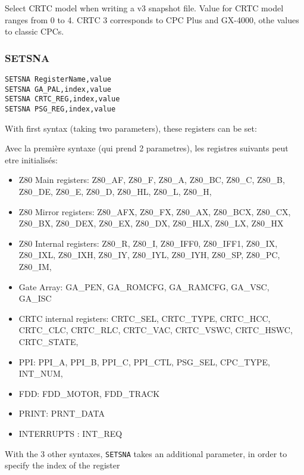 \begin{xen}
Select CRTC model when writing a v3 snapshot file. Value for CRTC model ranges from 0 to 4. CRTC 3 corresponds to CPC Plus and GX-4000, othe values to classic CPCs.
\end{xen}

\subsubsection{SETSNA}

\begin{verbatim}
SETSNA RegisterName,value
SETSNA GA_PAL,index,value
SETSNA CRTC_REG,index,value
SETSNA PSG_REG,index,value
\end{verbatim}

\begin{xen}
With first syntax (taking two parameters), these registers can be set:
\end{xen}

\begin{xfr}
Avec la première syntaxe (qui prend 2 parametres), les registres suivants peut etre initialisés:
\end{xfr}

\begin{itemize}
\item Z80 Main registers:
  Z80\_AF, Z80\_F, Z80\_A, Z80\_BC, Z80\_C, Z80\_B, Z80\_DE, Z80\_E, Z80\_D, Z80\_HL, Z80\_L, Z80\_H,
\item Z80 Mirror registers:
  Z80\_AFX, Z80\_FX, Z80\_AX, Z80\_BCX, Z80\_CX, Z80\_BX, Z80\_DEX, Z80\_EX, Z80\_DX, Z80\_HLX, Z80\_LX, Z80\_HX
\item Z80 Internal registers:
  Z80\_R, Z80\_I, Z80\_IFF0, Z80\_IFF1, Z80\_IX, Z80\_IXL, Z80\_IXH, Z80\_IY, Z80\_IYL, Z80\_IYH, Z80\_SP, Z80\_PC, Z80\_IM,
\item Gate Array:
  GA\_PEN, GA\_ROMCFG, GA\_RAMCFG, GA\_VSC, GA\_ISC
\item CRTC internal registers:
  CRTC\_SEL, CRTC\_TYPE, CRTC\_HCC, CRTC\_CLC, CRTC\_RLC, CRTC\_VAC, CRTC\_VSWC, CRTC\_HSWC, CRTC\_STATE,
\item PPI:
  PPI\_A, PPI\_B, PPI\_C, PPI\_CTL, PSG\_SEL, CPC\_TYPE, INT\_NUM,
\item FDD:
  FDD\_MOTOR, FDD\_TRACK
\item PRINT:
  PRNT\_DATA
\item INTERRUPTS : INT\_REQ
\end{itemize}

\begin{xen}
  With the 3 other syntaxes, \texttt{SETSNA} takes an additional parameter, in order to specify the index of the register
\end{xen}

